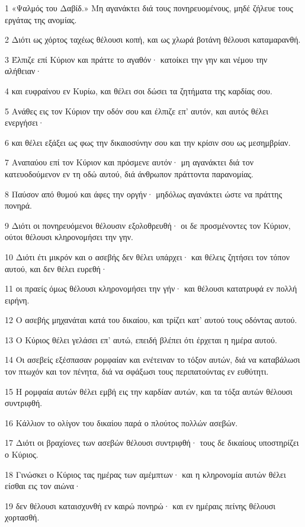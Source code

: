 \par 1 «Ψαλμός του Δαβίδ.» Μη αγανάκτει διά τους πονηρευομένους, μηδέ ζήλευε τους εργάτας της ανομίας.
\par 2 Διότι ως χόρτος ταχέως θέλουσι κοπή, και ως χλωρά βοτάνη θέλουσι καταμαρανθή.
\par 3 Έλπιζε επί Κύριον και πράττε το αγαθόν· κατοίκει την γην και νέμου την αλήθειαν·
\par 4 και ευφραίνου εν Κυρίω, και θέλει σοι δώσει τα ζητήματα της καρδίας σου.
\par 5 Ανάθες εις τον Κύριον την οδόν σου και έλπιζε επ' αυτόν, και αυτός θέλει ενεργήσει·
\par 6 και θέλει εξάξει ως φως την δικαιοσύνην σου και την κρίσιν σου ως μεσημβρίαν.
\par 7 Αναπαύου επί τον Κύριον και πρόσμενε αυτόν· μη αγανάκτει διά τον κατευοδούμενον εν τη οδώ αυτού, διά άνθρωπον πράττοντα παρανομίας.
\par 8 Παύσον από θυμού και άφες την οργήν· μηδόλως αγανάκτει ώστε να πράττης πονηρά.
\par 9 Διότι οι πονηρευόμενοι θέλουσιν εξολοθρευθή· οι δε προσμένοντες τον Κύριον, ούτοι θέλουσι κληρονομήσει την γην.
\par 10 Διότι έτι μικρόν και ο ασεβής δεν θέλει υπάρχει· και θέλεις ζητήσει τον τόπον αυτού, και δεν θέλει ευρεθή·
\par 11 οι πραείς όμως θέλουσι κληρονομήσει την γήν· και θέλουσι κατατρυφά εν πολλή ειρήνη.
\par 12 Ο ασεβής μηχανάται κατά του δικαίου, και τρίζει κατ' αυτού τους οδόντας αυτού.
\par 13 Ο Κύριος θέλει γελάσει επ' αυτώ, επειδή βλέπει ότι έρχεται η ημέρα αυτού.
\par 14 Οι ασεβείς εξέσπασαν ρομφαίαν και ενέτειναν το τόξον αυτών, διά να καταβάλωσι τον πτωχόν και τον πένητα, διά να σφάξωσι τους περιπατούντας εν ευθύτητι.
\par 15 Η ρομφαία αυτών θέλει εμβή εις την καρδίαν αυτών, και τα τόξα αυτών θέλουσι συντριφθή.
\par 16 Κάλλιον το ολίγον του δικαίου παρά ο πλούτος πολλών ασεβών.
\par 17 Διότι οι βραχίονες των ασεβών θέλουσι συντριφθή· τους δε δικαίους υποστηρίζει ο Κύριος.
\par 18 Γινώσκει ο Κύριος τας ημέρας των αμέμπτων· και η κληρονομία αυτών θέλει είσθαι εις τον αιώνα·
\par 19 δεν θέλουσι καταισχυνθή εν καιρώ πονηρώ· και εν ημέραις πείνης θέλουσι χορτασθή.
